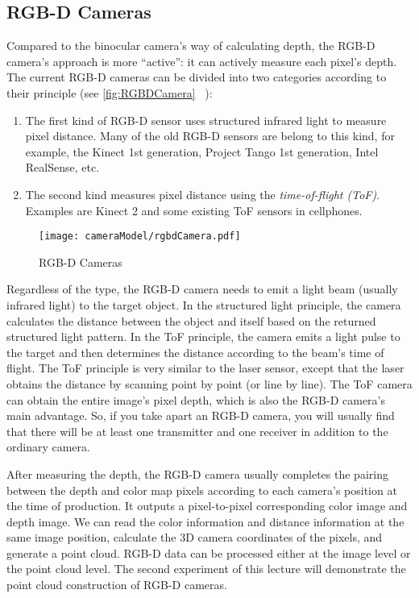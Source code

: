 \subsection{RGB-D Cameras}
Compared to the binocular camera's way of calculating depth, the RGB-D camera's approach is more ``active'': it can actively measure each pixel's depth. The current RGB-D cameras can be divided into two categories according to their principle (see \autoref {fig:RGBDCamera} ~):

\begin{enumerate}
\item The first kind of RGB-D sensor uses structured infrared light to measure pixel distance. Many of the old RGB-D sensors are belong to this kind, for example, the Kinect 1st generation, Project Tango 1st generation, Intel RealSense, etc.
\item The second kind measures pixel distance using the \textit{time-of-flight (ToF)}. Examples are Kinect 2 and some existing ToF sensors in cellphones.
\end{enumerate}

\begin{figure}[!ht]
    \centering
    \texttt{[image: cameraModel/rgbdCamera.pdf]}
    \caption{RGB-D Cameras}
    \label{fig:RGBDCamera}
\end{figure}

Regardless of the type, the RGB-D camera needs to emit a light beam (usually infrared light) to the target object. In the structured light principle, the camera calculates the distance between the object and itself based on the returned structured light pattern. In the ToF principle, the camera emits a light pulse to the target and then determines the distance according to the beam's time of flight. The ToF principle is very similar to the laser sensor, except that the laser obtains the distance by scanning point by point (or line by line). The ToF camera can obtain the entire image's pixel depth, which is also the RGB-D camera's main advantage. So, if you take apart an RGB-D camera, you will usually find that there will be at least one transmitter and one receiver in addition to the ordinary camera.

After measuring the depth, the RGB-D camera usually completes the pairing between the depth and color map pixels according to each camera's position at the time of production. It outputs a pixel-to-pixel corresponding color image and depth image. We can read the color information and distance information at the same image position, calculate the 3D camera coordinates of the pixels, and generate a point cloud. RGB-D data can be processed either at the image level or the point cloud level. The second experiment of this lecture will demonstrate the point cloud construction of RGB-D cameras.

